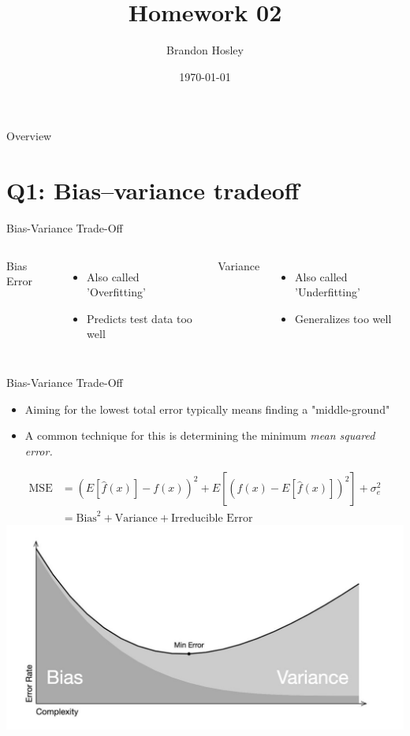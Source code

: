\documentclass{beamer}
\title{Homework 02}
\author{Brandon Hosley}
\institute{University of Illinois - Springfield}
\date{\today}
\begin{document}
\frame{\titlepage}

\begin{frame}{Overview}
\tableofcontents
\end{frame}

\section[Q1]{Q1: Bias–variance tradeoff}

\begin{frame}{Bias-Variance Trade-Off}
	\begin{columns}
		Bias Error
		\begin{itemize}
			\item<1-> Also called 'Overfitting'
			\item<4-> Predicts test data too well
		\end{itemize}
		
		Variance 
		\begin{itemize}
			\item<2-> Also called 'Underfitting'
			\item<5-> Generalizes too well
		\end{itemize}
	\end{columns}
	\centering
\end{frame}

\begin{frame}{Bias-Variance Trade-Off}
	\begin{itemize}%
		\item Aiming for the lowest total error typically means finding a "middle-ground"
		\item A common technique for this is determining the minimum \emph{mean squared error.} 
	\end{itemize}
	\begin{align*}
		\text{MSE} &= \left( E\left[\hat{f}(x)\right]-f(x)\right)^2 + E\left[\left(\hat{f}(x) - E\left[\hat{f}(x)\right]\right)^2\right] +
		\sigma^2_e \\
		&= \text{Bias}^2 + \text{Variance} + \text{Irreducible Error}
	\end{align*}
	\centering
	\includegraphics[width=0.5\linewidth]{MinError}
\end{frame}
\end{document}
